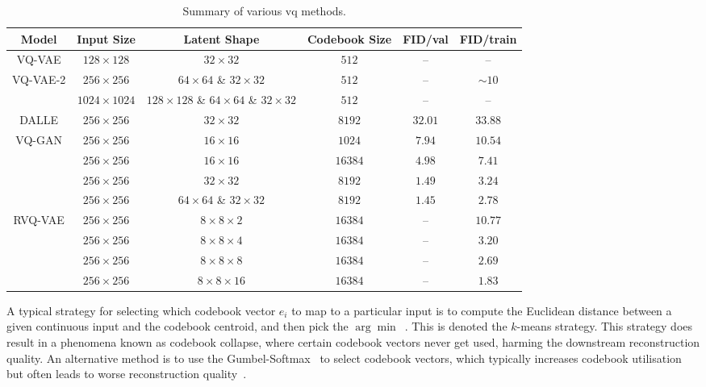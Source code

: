 \begin{table}[ht]
    \centering
    \begin{tabular}{|c|c|c|c|c|c|}
        \hline
        \textbf{Model} & \textbf{Input Size} & \textbf{Latent Shape} & \textbf{Codebook Size} & \textbf{FID/val} & \textbf{FID/train} \\
        \hline
        VQ-VAE & $128 \times 128$ & $32 \times 32$ & $512$ & -- & -- \\
        \hline
        VQ-VAE-2 & $256 \times 256$ & $64 \times 64$ \& $32 \times 32$ & $512$ & --& $\sim 10$ \\
                 & $1024 \times 1024$ & $128 \times 128$ \& $64 \times 64$ \& $32 \times 32$ & $512$ & -- & -- \\
        \hline
        DALLE & $256 \times 256$ & $32 \times 32$ & $8192$ & $32.01$ & $33.88$ \\
        \hline
        VQ-GAN & $256 \times 256$ & $16 \times 16$ & $1024$ & $7.94$ & $10.54$ \\
        & $256 \times 256$ & $16 \times 16$ & $16384$ & $4.98$ & $7.41$ \\
        & $256 \times 256$ & $32 \times 32$ & $8192$ & $1.49$ & $3.24$ \\
        & $256 \times 256$ & $64 \times 64$ \& $32 \times 32$ & $8192$ & $1.45$ & $2.78$ \\
        \hline
        RVQ-VAE & $256 \times 256$ & $8 \times 8 \times 2$ & $16384$ & -- & $10.77$ \\
        & $256 \times 256$ & $8 \times 8 \times 4$ & $16384$ & -- & $3.20$ \\
        & $256 \times 256$ & $8 \times 8 \times 8$ & $16384$ & -- & $2.69$ \\
        & $256 \times 256$ & $8 \times 8 \times 16$ & $16384$ & -- & $1.83$ \\
        \hline
    \end{tabular}
    \caption[Table]{Summary of various \acrfull{vq} methods.}
\end{table}

A typical strategy for selecting which codebook vector $e_i$ to map to a
particular input is to compute the Euclidean distance between a given continuous
input and the codebook centroid, and then pick the
$\arg\min$~\cite{oord2017vqvae}. This is denoted the $k$-means strategy. This
strategy does result in a phenomena known as codebook collapse, where certain
codebook vectors never get used, harming the downstream reconstruction quality.
An alternative method is to use the Gumbel-Softmax~\cite{jang2016gumbel} to
select codebook vectors, which typically increases codebook utilisation but
often leads to worse reconstruction quality~\cite{bondtaylor2021unleashing}.


